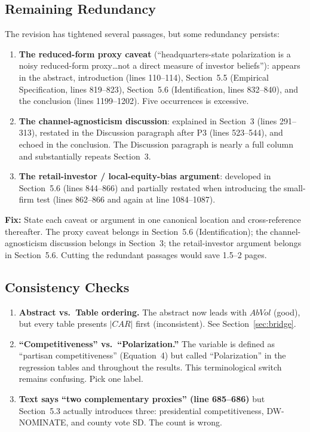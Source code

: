 \documentclass[11pt]{article}
\begin{document}
\subsection{Remaining Redundancy}

The revision has tightened several passages, but some redundancy persists:

\begin{enumerate}[leftmargin=*]
    \item \textbf{The reduced-form proxy caveat} (``headquarters-state polarization is a noisy reduced-form proxy\ldots not a direct measure of investor beliefs''): appears in the abstract, introduction (lines 110--114), Section~5.5 (Empirical Specification, lines 819--823), Section~5.6 (Identification, lines 832--840), and the conclusion (lines 1199--1202). Five occurrences is excessive.

    \item \textbf{The channel-agnosticism discussion}: explained in Section~3 (lines 291--313), restated in the Discussion paragraph after P3 (lines 523--544), and echoed in the conclusion. The Discussion paragraph is nearly a full column and substantially repeats Section~3.

    \item \textbf{The retail-investor / local-equity-bias argument}: developed in Section~5.6 (lines 844--866) and partially restated when introducing the small-firm test (lines 862--866 and again at line 1084--1087).
\end{enumerate}

\begin{majorbox}
\textbf{Fix:} State each caveat or argument in one canonical location and cross-reference thereafter. The proxy caveat belongs in Section~5.6 (Identification); the channel-agnosticism discussion belongs in Section~3; the retail-investor argument belongs in Section~5.6. Cutting the redundant passages would save 1.5--2 pages.
\end{majorbox}

\subsection{Consistency Checks}

\begin{enumerate}[leftmargin=*]
    \item \textbf{Abstract vs.\ Table ordering.} The abstract now leads with $AbVol$ (good), but every table presents $|CAR|$ first (inconsistent). See Section~\ref{sec:bridge}.

    \item \textbf{``Competitiveness'' vs.\ ``Polarization.''} The variable is defined as ``partisan competitiveness'' (Equation~4) but called ``Polarization'' in the regression tables and throughout the results. This terminological switch remains confusing. Pick one label.

    \item \textbf{Text says ``two complementary proxies'' (line 685--686)} but Section~5.3 actually introduces three: presidential competitiveness, DW-NOMINATE, and county vote SD. The count is wrong.
\end{enumerate}
\end{document}
